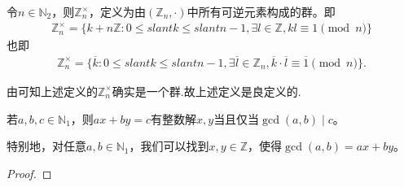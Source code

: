 \documentclass[../../main.tex]{subfiles}
\begin{document}
\begin{definition}
令$n \in \mathbb{N}_2$，则$\mathbb{Z}_n^\times$，定义为由$(\mathbb{Z}_n, \cdot)$中所有可逆元素构成的群。即
\begin{align*}
\mathbb{Z}_n^\times = \{k + n\mathbb{Z} : 0 \leqslant slant k \leqslant slant n - 1, \exists l \in \mathbb{Z}, kl \equiv 1 \pmod{n}\}
\end{align*}
也即
\begin{align*}
\mathbb{Z} _{n}^{\times}=\{\overline{k}:0\leqslant slant k\leqslant slant n-1,\exists \overline{l}\in \mathbb{Z} _n,\overline{k}\cdot \overline{l}\equiv \overline{1} \pmod{n} \}.
\end{align*}
\end{definition}
\begin{remark}
由可知上述定义的$\mathbb{Z}_n^\times$确实是一个群.故上述定义是良定义的.
\end{remark}

\begin{lemma}[Bézout定理]\label{lemma:Bézout定理}
若$a, b, c \in \mathbb{N}_1$，则$ax + by = c$有整数解$x, y$当且仅当$\gcd(a, b) \mid c$。

特别地，对任意$a, b \in \mathbb{N}_1$，我们可以找到$x, y \in \mathbb{Z}$，使得$\gcd(a, b) = ax + by$。
\end{lemma}
\begin{proof}

\end{proof}
\end{document}
